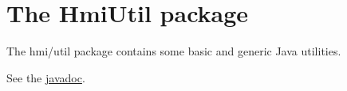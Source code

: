 \ifx \hmiutilreportdir \undefinedmacro {} \fi
\ifx \webserver \undefinedmacro \def \webserver{http://elckerlyc.sourceforge.net/javadoc/Hmi/} \fi

\chapter{The HmiUtil package}
The hmi/util package contains some basic and generic Java utilities.

%


See the \href{\webserver}{javadoc}.

%
